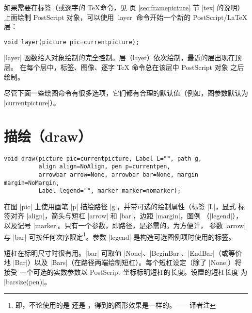 \documentclass[nofonts,CJKnormalspaces]{ctexbook}[2009/05/20]
\newcommand*\prgname[1]{\textsf{#1}}
\newcommand\transnote[1]{\footnote{#1——译者注}}
\begin{document}
如果需要在标签（或逐字的 \TeX 命令，见 \pageref{sec:framepicture} 页
\ref{sec:framepicture} 节 |tex| 的说明）上面绘制 \prgname{PostScript}
对象，可以使用 |layer| 命令开始一个新的 \prgname{PostScript}/\LaTeX{} 层：
\begin{lstlisting}
void layer(picture pic=currentpicture);
\end{lstlisting}
|layer| 函数给人对象绘制的完全控制。层（layer）依次绘制，最近的层出现在顶层。
在每个层中，标签、图像、逐字 \TeX{} 命令总在该层中 \prgname{PostScript} 对象
之后绘制。

尽管下面一些绘图命令有很多选项，它们都有合理的默认值（例如，图参数默认为
|currentpicture|）。


\section{描绘（draw）}

\begin{lstlisting}
void draw(picture pic=currentpicture, Label L="", path g,
          align align=NoAlign, pen p=currentpen,
          arrowbar arrow=None, arrowbar bar=None, margin margin=NoMargin,
          Label legend="", marker marker=nomarker);
\end{lstlisting}
在图 |pic| 上使用画笔 |p| 描绘路径 |g|，并带可选的绘制属性（标签 |L|，显式
标签对齐 |align|，箭头与短杠 |arrow| 和 |bar|，边距 |margin|，图例
（|legend|），以及记号 |marker|。只有一个参数，即路径，是必需的。为方便计，
参数 |arrow| 与 |bar| 可按任何次序限定\transnote{即，不论使用的是
 还是
\inlinecode{draw(g, EndArrow, BeginBar)}，得到的图形效果是一样的。}。参数
|legend| 是构造可选图例项时使用的标签。

短杠在标明尺寸时很有用。|bar| 可取值 |None|、|BeginBar|、|EndBar|（或等价地
|Bar|）以及 |Bars|（在路径两端绘制短杠）。每个短杠设定（除了 |None|）将接受
一个可选的实数参数以 \prgname{PostScript} 坐标标明短杠的长度。设置的短杠长度
为 |barsize(pen)|。
\end{document}
